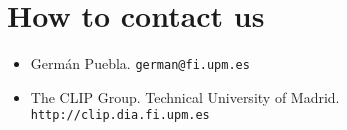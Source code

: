 \documentclass[12pt]{article}
\begin{document}
\vspace*{-0.7cm}
\section*{How to contact us}
\vspace*{-0.5cm}

\begin{itemize}

\item Germ\'{a}n Puebla. {\tt german@fi.upm.es}
\item The CLIP Group. Technical University of Madrid.\\
 {\tt http://clip.dia.fi.upm.es}
\end{itemize}
\end{document}
